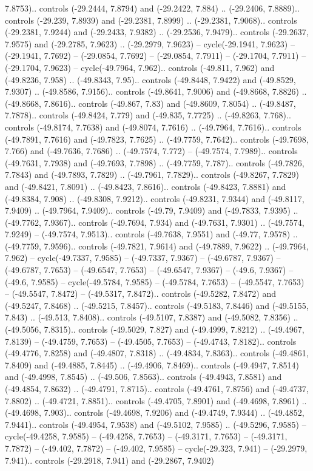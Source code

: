 \begin{scope}[shift={(2.5552, 9.9912)}]
\begin{scope}[shift={(48.1654, -14.8546)}]
7.8753).. controls (-29.2444, 7.8794) and (-29.2422, 7.884) .. (-29.2406, 7.8889).. controls (-29.239, 7.8939) and (-29.2381, 7.8999) .. (-29.2381, 7.9068).. controls (-29.2381, 7.9244) and (-29.2433, 7.9382) .. (-29.2536, 7.9479).. controls (-29.2637, 7.9575) and (-29.2785, 7.9623) .. (-29.2979, 7.9623) -- cycle(-29.1941, 7.9623) -- (-29.1941, 7.7692) -- (-29.0854, 7.7692) -- (-29.0854, 7.7911) -- (-29.1704, 7.7911) -- (-29.1704, 7.9623) -- cycle(-49.7964, 7.962).. controls (-49.811, 7.962) and (-49.8236, 7.958) .. (-49.8343, 7.95).. controls (-49.8448, 7.9422) and (-49.8529, 7.9307) .. (-49.8586, 7.9156).. controls (-49.8641, 7.9006) and (-49.8668, 7.8826) .. (-49.8668, 7.8616).. controls (-49.867, 7.83) and (-49.8609, 7.8054) .. (-49.8487, 7.7878).. controls (-49.8424, 7.779) and (-49.835, 7.7725) .. (-49.8263, 7.768).. controls (-49.8174, 7.7638) and (-49.8074, 7.7616) .. (-49.7964, 7.7616).. controls (-49.7891, 7.7616) and (-49.7823, 7.7625) .. (-49.7759, 7.7642).. controls (-49.7698, 7.766) and (-49.7636, 7.7686) .. (-49.7574, 7.772) -- (-49.7574, 7.7989).. controls (-49.7631, 7.7938) and (-49.7693, 7.7898) .. (-49.7759, 7.787).. controls (-49.7826, 7.7843) and (-49.7893, 7.7829) .. (-49.7961, 7.7829).. controls (-49.8267, 7.7829) and (-49.8421, 7.8091) .. (-49.8423, 7.8616).. controls (-49.8423, 7.8881) and (-49.8384, 7.908) .. (-49.8308, 7.9212).. controls (-49.8231, 7.9344) and (-49.8117, 7.9409) .. (-49.7964, 7.9409).. controls (-49.79, 7.9409) and (-49.7833, 7.9395) .. (-49.7762, 7.9367).. controls (-49.7694, 7.934) and (-49.7631, 7.9301) .. (-49.7574, 7.9249) -- (-49.7574, 7.9513).. controls (-49.7638, 7.9551) and (-49.77, 7.9578) .. (-49.7759, 7.9596).. controls (-49.7821, 7.9614) and (-49.7889, 7.9622) .. (-49.7964, 7.962) -- cycle(-49.7337, 7.9585) -- (-49.7337, 7.9367) -- (-49.6787, 7.9367) -- (-49.6787, 7.7653) -- (-49.6547, 7.7653) -- (-49.6547, 7.9367) -- (-49.6, 7.9367) -- (-49.6, 7.9585) -- cycle(-49.5784, 7.9585) -- (-49.5784, 7.7653) -- (-49.5547, 7.7653) -- (-49.5547, 7.8472) -- (-49.5317, 7.8472).. controls (-49.5282, 7.8472) and (-49.5247, 7.8468) .. (-49.5215, 7.8457).. controls (-49.5183, 7.8446) and (-49.5155, 7.843) .. (-49.513, 7.8408).. controls (-49.5107, 7.8387) and (-49.5082, 7.8356) .. (-49.5056, 7.8315).. controls (-49.5029, 7.827) and (-49.4999, 7.8212) .. (-49.4967, 7.8139) -- (-49.4759, 7.7653) -- (-49.4505, 7.7653) -- (-49.4743, 7.8182).. controls (-49.4776, 7.8258) and (-49.4807, 7.8318) .. (-49.4834, 7.8363).. controls (-49.4861, 7.8409) and (-49.4885, 7.8445) .. (-49.4906, 7.8469).. controls (-49.4947, 7.8514) and (-49.4998, 7.8545) .. (-49.506, 7.8563).. controls (-49.4943, 7.8581) and (-49.4854, 7.8632) .. (-49.4791, 7.8715).. controls (-49.4761, 7.8756) and (-49.4737, 7.8802) .. (-49.4721, 7.8851).. controls (-49.4705, 7.8901) and (-49.4698, 7.8961) .. (-49.4698, 7.903).. controls (-49.4698, 7.9206) and (-49.4749, 7.9344) .. (-49.4852, 7.9441).. controls (-49.4954, 7.9538) and (-49.5102, 7.9585) .. (-49.5296, 7.9585) -- cycle(-49.4258, 7.9585) -- (-49.4258, 7.7653) -- (-49.3171, 7.7653) -- (-49.3171, 7.7872) -- (-49.402, 7.7872) -- (-49.402, 7.9585) -- cycle(-29.323, 7.941) -- (-29.2979, 7.941).. controls (-29.2918, 7.941) and (-29.2867, 7.9402) 
\end{scope}
\end{scope}
